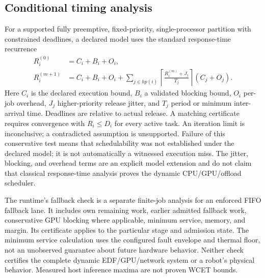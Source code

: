 \documentclass[11pt,a4paper]{article}
\begin{document}
\subsection{Conditional timing analysis}
For a supported fully preemptive, fixed-priority, single-processor partition with
constrained deadlines, a declared model uses the standard response-time
recurrence
\begin{align}
 R_i^{(0)} &= C_i+B_i+O_i,\\
 R_i^{(m+1)} &= C_i+B_i+O_i+
 \sum_{j\in hp(i)}\left\lceil\frac{R_i^{(m)}+J_j}{T_j}\right\rceil(C_j+O_j).
\end{align}
Here $C_i$ is the declared execution bound, $B_i$ a validated blocking bound,
$O_i$ per-job overhead, $J_j$ higher-priority release jitter, and $T_j$ period or
minimum inter-arrival time. Deadlines are relative to actual release. A matching
certificate requires convergence with $R_i\leq D_i$ for every active task.
An iteration limit is inconclusive; a contradicted assumption is unsupported.
Failure of this conservative test means that schedulability was not established
under the declared model; it is not automatically a witnessed execution miss.
The jitter, blocking, and overhead terms are an explicit model extension and do
not claim that classical response-time analysis proves the dynamic
CPU/GPU/offload scheduler.

The runtime's fallback check is a separate finite-job analysis for an enforced
FIFO fallback lane. It includes own remaining work, earlier admitted fallback
work, conservative GPU blocking where applicable, minimum service, memory, and
margin. Its certificate applies to the particular stage and admission state. The minimum
service calculation uses the configured fault envelope and thermal floor, not
an unobserved guarantee about future hardware behavior.
Neither check certifies the complete dynamic EDF/GPU/network system or a robot's
physical behavior. Measured host inference maxima are not proven WCET bounds.
\end{document}
